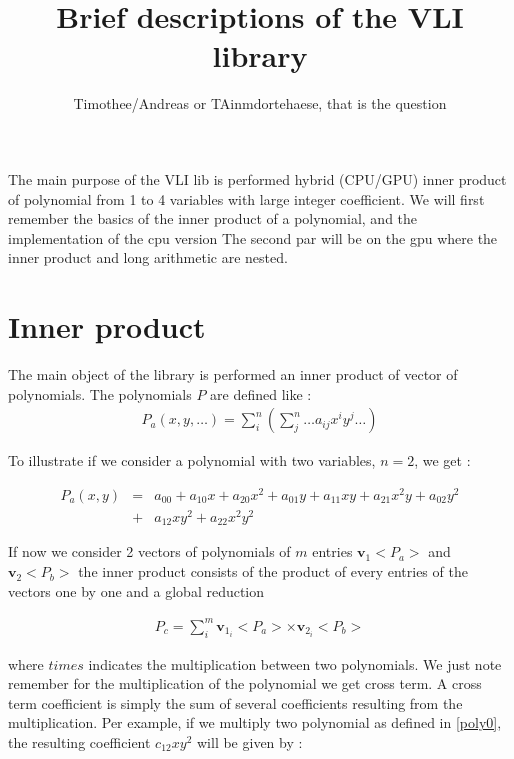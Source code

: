 \documentclass[11pt]{amsart}
\title{Brief descriptions of the VLI library}
\author{Timothee/Andreas or TAinmdortehaese, that is the question}
\begin{document}
\maketitle


The main purpose of the VLI lib is performed hybrid (CPU/GPU) inner product of polynomial from 1 to 4 variables with large integer coefficient. We will first remember the basics of the inner product of a polynomial, 
and the implementation of the cpu version  The second par will be on the gpu where the inner product and long arithmetic are nested.

\section*{Inner product}

The main object of the library is performed an inner product of vector of polynomials. The polynomials $P$ are defined like :
\begin{eqnarray}
P_a(x,y,\dots) = \sum_i^n \left( \sum_j^n \dots a_{ij} x^i y^j \dots \right)
\end{eqnarray}

To illustrate if we consider a polynomial with two variables,  $n=2$, we get :

\begin{eqnarray}
P_a(x,y) &=&   a_{00} + a_{10}x + a_{20}x^2 + a_{01}y + a_{11} xy + a_{21}x^2y +  a_{02}y^2  \\
              &+ & a_{12}xy^2 + a_{22}x^2y^2 \nonumber \label{poly0}
\end{eqnarray}
 
 If now we consider 2 vectors of polynomials of $m$ entries  $\boldsymbol{v}_1<P_a>$ and  $\boldsymbol{v}_2<P_b>$ the inner product  consists of the product 
 of every entries of the vectors one by one and a global reduction 
 
 \begin{eqnarray}
 P_c = \sum_i^m \boldsymbol{v}_{1_i}<P_a>  \times  \boldsymbol{v}_{2_i}<P_b> \label{poly1}
\end{eqnarray}

where $times$ indicates the multiplication between two polynomials. We just note remember for the multiplication of the polynomial we get cross term. A cross term coefficient is simply the 
sum of several coefficients resulting from the multiplication. Per example, if we multiply two polynomial as defined in \ref{poly0}, the resulting coefficient $c_{12}xy^2$ will be given by : 
\end{document}
